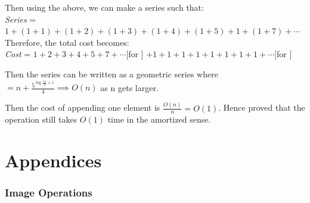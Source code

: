 \documentclass[addpoints]{exam}
\begin{document}
\begin{questions}
\begin{solution}
    Then using the above, we can make a series such that: \\ 
    \textit{Series} = $ 1 + (1 + 1) + (1 + 2) + (1 + 3) + (1 + 4) + (1 + 5) + 1 + (1 + 7) + \cdots $ \\ 
    Therefore, the total cost becomes: \\ 
    \textit{Cost} = $ 1 + 2 + 3 + 4 + 5 + 7 + \cdots $[for ] $ + 1 + 1 + 1 + 1 + 1 + 1 + 1 + 1 + \cdots $[for ]

    Then the series can be written as a geometric series where  $ = n + \displaystyle\frac{5^{\log\frac{5n}{4} + 1}}{4} \implies O(n) $ as n gets larger. 

    Then the cost of appending one element is $ \frac{O(n)}{n} = O(1) $. Hence proved that the  operation still takes $ O(1) $ time in the amortized sense.  
    
  \end{solution}

\end{questions}

\newpage
\part{Appendices}

\appendix
\section{}


\newpage
\section{}


\newpage
\section{Image Operations}

\end{document}
